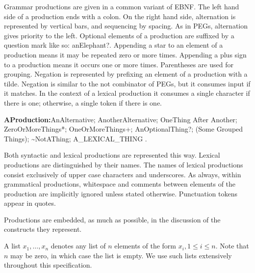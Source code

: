 \documentclass{article}
\newcommand{\code}[1]{{\sf #1}}
\begin{document}
\LMHash{}
Grammar productions are given in a common variant of EBNF.  The left hand side of a production ends with a colon.  On the right hand side, alternation is represented by vertical bars, and sequencing by spacing.  As in PEGs, alternation gives priority to the left. Optional elements of a production are suffixed by a question mark like so: \code{anElephant?}.  Appending a star to an element of a production means it may be repeated zero or more times.  Appending a plus sign to a production means it occurs one or more times. Parentheses are used for grouping. Negation  is represented by prefixing an element of a production with a tilde. Negation is similar to the not combinator of PEGs, but it consumes input if it matches. In the context of a lexical production it consumes a single character if there is one;  otherwise, a single token if there is one.


\begin{grammar}
{\sf
{\bf AProduction:}AnAlternative;
    AnotherAlternative;
    OneThing After Another;
    ZeroOrMoreThings*;
    OneOrMoreThings+;
    AnOptionalThing?;
    (Some Grouped Things);
    \~{}NotAThing;
    A\_LEXICAL\_THING
    .
    }
\end{grammar}


\LMHash{}
Both syntactic and lexical productions are represented this way. Lexical productions are distinguished by their names. The names of lexical productions consist exclusively of upper case characters and underscores.  As always, within grammatical productions, whitespace and comments between elements of the production are implicitly ignored unless stated otherwise. 
Punctuation tokens appear in quotes. 

\LMHash{}
Productions are embedded, as much as possible, in the discussion of the constructs they represent. 

\LMHash{}
A list $x_1, \ldots, x_n$ denotes any list of $n$ elements of the form $x_i, 1 \le i \le n$. Note that $n$ may be zero, in which case the list is empty. We use such lists extensively throughout this specification.
\end{document}
